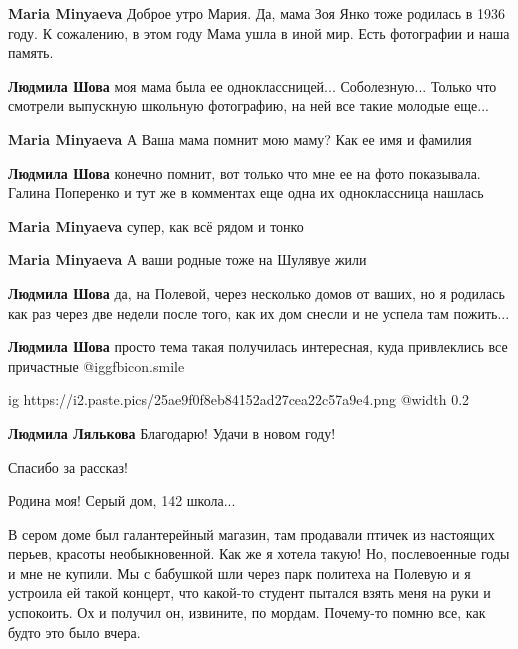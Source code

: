 \begin{itemize}
\begin{itemize}
\begin{itemize} %
\textbf{Maria Minyaeva} Доброе утро Мария.
Да, мама Зоя Янко тоже родилась в 1936 году. К сожалению, в этом году Мама ушла в иной мир.
Есть фотографии и наша память.

\textbf{Людмила Шова} моя мама была ее одноклассницей... Соболезную...
Только что смотрели выпускную школьную фотографию, на ней все такие молодые еще...

\textbf{Maria Minyaeva}
А Ваша мама помнит мою маму?
Как ее имя и фамилия

\textbf{Людмила Шова} конечно помнит, вот только что мне ее на фото показывала. Галина Поперенко и тут же в комментах еще одна их одноклассница нашлась

\textbf{Maria Minyaeva} супер, как всё рядом и тонко

\textbf{Maria Minyaeva} А ваши родные тоже на Шулявуе жили

\textbf{Людмила Шова} да, на Полевой, через несколько домов от ваших, но я родилась как раз через две недели после того, как их дом снесли и не успела там пожить...

\textbf{Людмила Шова} просто тема такая получилась интересная, куда привлеклись все причастные  @igg{fbicon.smile} 
\end{itemize} %

\end{itemize} %


\ifcmt
  ig https://i2.paste.pics/25ae9f0f8eb84152ad27cea22c57a9e4.png
  @width 0.2
\fi

\textbf{Людмила Лялькова} Благодарю! Удачи в новом году!

Спасибо за рассказ!

Родина моя! Серый дом, 142 школа...

\begin{itemize} %

В сером доме был галантерейный магазин, там продавали птичек из настоящих
перьев, красоты необыкновенной. Как же я хотела такую! Но, послевоенные годы и
мне не купили. Мы с бабушкой шли через парк политеха на Полевую и я устроила ей
такой концерт, что какой-то студент пытался взять меня на руки и успокоить. Ох
и получил он, извините, по мордам. Почему-то помню все, как будто это было
вчера.


\end{itemize}
\end{itemize}
